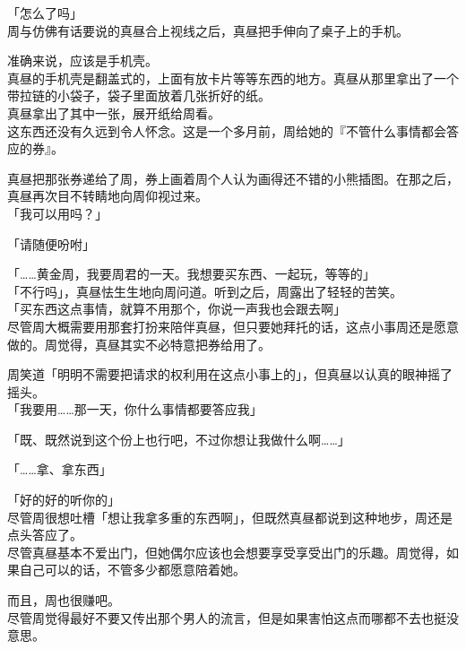 「怎么了吗」\\

周与仿佛有话要说的真昼合上视线之后，真昼把手伸向了桌子上的手机。

准确来说，应该是手机壳。\\

真昼的手机壳是翻盖式的，上面有放卡片等等东西的地方。真昼从那里拿出了一个带拉链的小袋子，袋子里面放着几张折好的纸。\\

真昼拿出了其中一张，展开纸给周看。\\

这东西还没有久远到令人怀念。这是一个多月前，周给她的『不管什么事情都会答应的券』。

真昼把那张券递给了周，券上画着周个人认为画得还不错的小熊插图。在那之后，真昼再次目不转睛地向周仰视过来。\\

「我可以用吗？」

「请随便吩咐」

「……黄金周，我要周君的一天。我想要买东西、一起玩，等等的」\\

「不行吗」，真昼怯生生地向周问道。听到之后，周露出了轻轻的苦笑。\\

「买东西这点事情，就算不用那个，你说一声我也会跟去啊」\\

尽管周大概需要用那套打扮来陪伴真昼，但只要她拜托的话，这点小事周还是愿意做的。周觉得，真昼其实不必特意把券给用了。

周笑道「明明不需要把请求的权利用在这点小事上的」，但真昼以认真的眼神摇了摇头。\\

「我要用……那一天，你什么事情都要答应我」

「既、既然说到这个份上也行吧，不过你想让我做什么啊……」

「……拿、拿东西」

「好的好的听你的」\\

尽管周很想吐槽「想让我拿多重的东西啊」，但既然真昼都说到这种地步，周还是点头答应了。\\

尽管真昼基本不爱出门，但她偶尔应该也会想要享受享受出门的乐趣。周觉得，如果自己可以的话，不管多少都愿意陪着她。

而且，周也很赚吧。\\

尽管周觉得最好不要又传出那个男人的流言，但是如果害怕这点而哪都不去也挺没意思。\\

